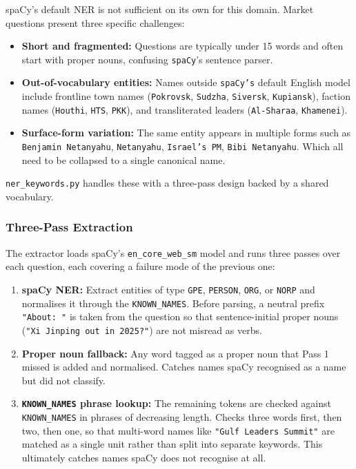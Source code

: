 \documentclass[11pt,a4paper]{article}
\begin{document}
\noindent spaCy's default NER is not sufficient on its own for this
domain. Market questions present three specific challenges:

\begin{itemize}
    \item \textbf{Short and fragmented:} Questions are typically
          under 15 words and often start with proper nouns,
          confusing \texttt{spaCy}'s sentence parser.
    \item \textbf{Out-of-vocabulary entities:} Names outside \texttt{spaCy's}
          default English model include frontline town names
          (\texttt{Pokrovsk}, \texttt{Sudzha}, \texttt{Siversk},
          \texttt{Kupiansk}), faction names (\texttt{Houthi},
          \texttt{HTS}, \texttt{PKK}), and transliterated leaders
          (\texttt{Al-Sharaa}, \texttt{Khamenei}).
    \item \textbf{Surface-form variation:} The same entity appears
          in multiple forms such as \texttt{Benjamin Netanyahu},
          \texttt{Netanyahu}, \texttt{Israel's PM}, \texttt{Bibi Netanyahu}. Which all need to be collapsed to a single canonical name.
\end{itemize}

\noindent \texttt{ner\_keywords.py} handles these with a three-pass
design backed by a shared vocabulary.

\subsubsection*{Three-Pass Extraction}

The extractor loads spaCy's \texttt{en\_core\_web\_sm} model and
runs three passes over each question, each covering a failure mode
of the previous one:

\begin{enumerate}
    \item \textbf{spaCy NER:} Extract entities of type \texttt{GPE},
          \texttt{PERSON}, \texttt{ORG}, or \texttt{NORP} and
          normalises it through the \texttt{KNOWN\_NAMES}. Before parsing, a
          neutral prefix \texttt{"About: "} is taken from the
          question so that sentence-initial proper nouns
          (\texttt{"Xi Jinping out in 2025?"}) are not misread as
          verbs.
    \item \textbf{Proper noun fallback:} Any word tagged as a proper
      noun that Pass 1 missed is added and normalised. Catches
      names spaCy recognised as a name but did not classify.

    \item \textbf{\texttt{KNOWN\_NAMES} phrase lookup:} The remaining
        tokens are checked against \texttt{KNOWN\_NAMES} in phrases
        of decreasing length. Checks three words first, then two, then one, so that multi-word names like \texttt{"Gulf Leaders Summit"}
        are matched as a single unit rather than split into separate
        keywords. This ultimately catches names spaCy does not recognise at all.
\end{enumerate}
\end{document}
